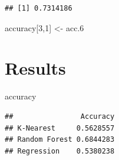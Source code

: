 \documentclass[
]{book}
\newenvironment{Shaded}{\begin{snugshade}}{\end{snugshade}}
\newcommand{\AttributeTok}[1]{\textcolor[rgb]{0.77,0.63,0.00}{#1}}
\newcommand{\DecValTok}[1]{\textcolor[rgb]{0.00,0.00,0.81}{#1}}
\newcommand{\FloatTok}[1]{\textcolor[rgb]{0.00,0.00,0.81}{#1}}
\newcommand{\FunctionTok}[1]{\textcolor[rgb]{0.00,0.00,0.00}{#1}}
\newcommand{\NormalTok}[1]{#1}
\newcommand{\OtherTok}[1]{\textcolor[rgb]{0.56,0.35,0.01}{#1}}
\newcommand{\SpecialCharTok}[1]{\textcolor[rgb]{0.00,0.00,0.00}{#1}}
\begin{document}
\begin{Shaded}
\end{Shaded}

\begin{verbatim}
## [1] 0.7314186
\end{verbatim}

\begin{Shaded}
\end{Shaded}

\begin{Shaded}
\begin{Highlighting}[]
\NormalTok{accuracy[}\DecValTok{3}\NormalTok{,}\DecValTok{1}\NormalTok{] }\OtherTok{\textless{}{-}}\NormalTok{ acc}\FloatTok{.6}
\end{Highlighting}
\end{Shaded}

\hypertarget{results}{%
\chapter{Results}\label{results}}

\begin{Shaded}
\begin{Highlighting}[]
\NormalTok{accuracy}
\end{Highlighting}
\end{Shaded}

\begin{verbatim}
##                Accuracy
## K-Nearest     0.5628557
## Random Forest 0.6844283
## Regression    0.5380238
\end{verbatim}
\end{document}
